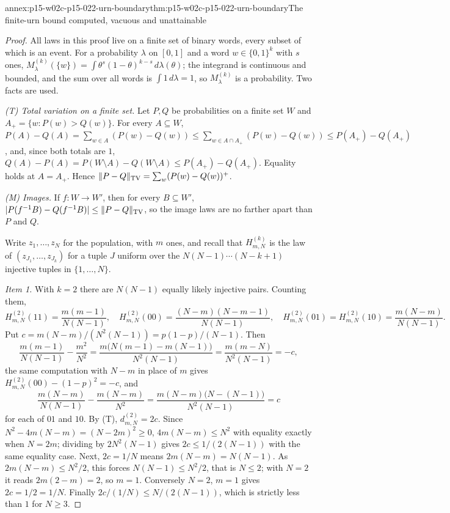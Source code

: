 \begin{annexitem}{annex:p15-w02c-p15-022-urn-boundary}{thm:p15-w02c-p15-022-urn-boundary}{The finite-urn bound computed, vacuous and unattainable}
\begin{proof}
All laws in this proof live on a finite set of binary words, every
subset of which is an event. For a probability \(\lambda\) on \([0,1]\)
and a word \(w\in\{0,1\}^k\) with \(s\) ones,
\(M_\lambda^{(k)}(\{w\})=\int\theta^s(1-\theta)^{k-s}\,d\lambda(\theta)\);
the integrand is continuous and bounded, and the sum over all words is
\(\int1\,d\lambda=1\), so \(M_\lambda^{(k)}\) is a probability. Two facts
are used.

\emph{(T) Total variation on a finite set.} Let \(P,Q\) be
probabilities on a finite set \(W\) and \(A_+=\{w:P(w)>Q(w)\}\). For
every \(A\subseteq W\),
\(P(A)-Q(A)=\sum_{w\in A}(P(w)-Q(w))\leq\sum_{w\in A\cap A_+}(P(w)-Q(w))
\leq P(A_+)-Q(A_+)\), and, since both totals are \(1\),
\(Q(A)-P(A)=P(W\setminus A)-Q(W\setminus A)\leq P(A_+)-Q(A_+)\).
Equality holds at \(A=A_+\). Hence
\(\|P-Q\|_{\rm TV}=\sum_w(P(w)-Q(w))^+\).

\emph{(M) Images.} If \(f:W\to W'\), then for every \(B\subseteq W'\),
\(|P(f^{-1}B)-Q(f^{-1}B)|\leq\|P-Q\|_{\rm TV}\), so the image laws are
no farther apart than \(P\) and \(Q\).

Write \(z_1,\ldots,z_N\) for the population, with \(m\) ones, and recall
that \(H_{m,N}^{(k)}\) is the law of \((z_{J_1},\ldots,z_{J_k})\) for a
tuple \(J\) uniform over the \(N(N-1)\cdots(N-k+1)\) injective tuples in
\(\{1,\ldots,N\}\).

\emph{Item 1.} With \(k=2\) there are \(N(N-1)\) equally likely
injective pairs. Counting them,
\[
 H_{m,N}^{(2)}(11)=\frac{m(m-1)}{N(N-1)},\quad
 H_{m,N}^{(2)}(00)=\frac{(N-m)(N-m-1)}{N(N-1)},\quad
 H_{m,N}^{(2)}(01)=H_{m,N}^{(2)}(10)=\frac{m(N-m)}{N(N-1)}.
\]
Put \(c=m(N-m)/(N^2(N-1))=p(1-p)/(N-1)\). Then
\[
 \frac{m(m-1)}{N(N-1)}-\frac{m^2}{N^2}
 =\frac{m\bigl(N(m-1)-m(N-1)\bigr)}{N^2(N-1)}
 =\frac{m(m-N)}{N^2(N-1)}=-c,
\]
the same computation with \(N-m\) in place of \(m\) gives
\(H_{m,N}^{(2)}(00)-(1-p)^2=-c\), and
\[
 \frac{m(N-m)}{N(N-1)}-\frac{m(N-m)}{N^2}
 =\frac{m(N-m)\bigl(N-(N-1)\bigr)}{N^2(N-1)}=c
\]
for each of \(01\) and \(10\). By (T), \(d_{m,N}^{(2)}=2c\).
Since \(N^2-4m(N-m)=(N-2m)^2\geq0\), \(4m(N-m)\leq N^2\) with equality
exactly when \(N=2m\); dividing by \(2N^2(N-1)\) gives
\(2c\leq1/(2(N-1))\) with the same equality case. Next,
\(2c=1/N\) means \(2m(N-m)=N(N-1)\). As \(2m(N-m)\leq N^2/2\), this
forces \(N(N-1)\leq N^2/2\), that is \(N\leq2\); with \(N=2\) it reads
\(2m(2-m)=2\), so \(m=1\). Conversely \(N=2\), \(m=1\) gives
\(2c=1/2=1/N\). Finally
\(2c\big/(1/N)\leq N/(2(N-1))\), which is strictly less than \(1\) for
\(N\geq3\).


\end{proof}
\end{annexitem}
